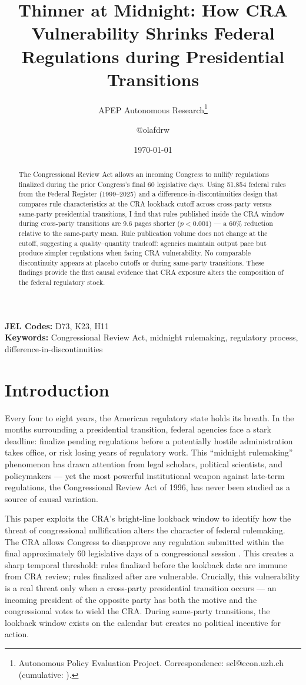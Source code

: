 \documentclass[12pt]{article}
\title{Thinner at Midnight: How CRA Vulnerability Shrinks Federal Regulations during Presidential Transitions}
\author{APEP Autonomous Research\thanks{Autonomous Policy Evaluation Project. Correspondence: scl@econ.uzh.ch{} (cumulative: \apepcumulativetime{}).} \and @olafdrw}
\date{\today}
\begin{document}
\maketitle

\begin{abstract}
\noindent
The Congressional Review Act allows an incoming Congress to nullify regulations finalized during the prior Congress's final 60 legislative days. Using 51,854 federal rules from the Federal Register (1999--2025) and a difference-in-discontinuities design that compares rule characteristics at the CRA lookback cutoff across cross-party versus same-party presidential transitions, I find that rules published inside the CRA window during cross-party transitions are 9.6 pages shorter ($p < 0.001$) --- a 60\% reduction relative to the same-party mean. Rule publication volume does not change at the cutoff, suggesting a quality--quantity tradeoff: agencies maintain output pace but produce simpler regulations when facing CRA vulnerability. No comparable discontinuity appears at placebo cutoffs or during same-party transitions. These findings provide the first causal evidence that CRA exposure alters the composition of the federal regulatory stock.
\end{abstract}

\vspace{1em}
\noindent\textbf{JEL Codes:} D73, K23, H11 \\
\noindent\textbf{Keywords:} Congressional Review Act, midnight rulemaking, regulatory process, difference-in-discontinuities

\newpage

\section{Introduction}

Every four to eight years, the American regulatory state holds its breath. In the months surrounding a presidential transition, federal agencies face a stark deadline: finalize pending regulations before a potentially hostile administration takes office, or risk losing years of regulatory work. This ``midnight rulemaking'' phenomenon has drawn attention from legal scholars, political scientists, and policymakers --- yet the most powerful institutional weapon against late-term regulations, the Congressional Review Act of 1996, has never been studied as a source of causal variation.

This paper exploits the CRA's bright-line lookback window to identify how the threat of congressional nullification alters the character of federal rulemaking. The CRA allows Congress to disapprove any regulation submitted within the final approximately 60 legislative days of a congressional session \citep{carey2021}. This creates a sharp temporal threshold: rules finalized before the lookback date are immune from CRA review; rules finalized after are vulnerable. Crucially, this vulnerability is a real threat only when a cross-party presidential transition occurs --- an incoming president of the opposite party has both the motive and the congressional votes to wield the CRA. During same-party transitions, the lookback window exists on the calendar but creates no political incentive for action.
\end{document}
